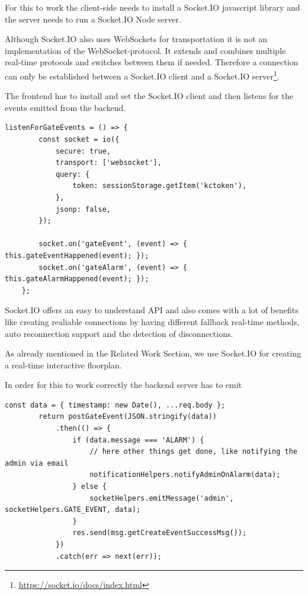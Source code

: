 For this to work the client-side needs to install a Socket.IO javascript library and the server needs to run a Socket.IO Node server. 

Although Socket.IO also uses WebSockets for transportation it is not an implementation of the WebSocket-protocol. It extends and combines multiple real-time protocols and switches between them if needed. Therefore a connection can only be established between a Socket.IO client and a Socket.IO server\footnote{\url{https://socket.io/docs/index.html}}.

The frontend has to install and set the Socket.IO client and then listens for the events emitted from the backend.

\begin{lstlisting}[label=socketIOClientSide]
listenForGateEvents = () => {
        const socket = io({
            secure: true,
            transport: ['websocket'],
            query: {
                token: sessionStorage.getItem('kctoken'),
            },
            jsonp: false,
        });

        socket.on('gateEvent', (event) => { this.gateEventHappened(event); });
        socket.on('gateAlarm', (event) => { this.gateAlarmHappened(event); });
    };
\end{lstlisting}



Socket.IO offers an easy to understand API and also comes with a lot of benefits like creating realiable connections by having different fallback real-time methods, auto reconnection support and the detection of disconnections.

As already mentioned in the Related Work Section, we use Socket.IO for creating a real-time interactive floorplan. 

In order for this to work correctly the backend server has to emit 

\begin{lstlisting}[label=socketIOServerSide]
const data = { timestamp: new Date(), ...req.body };
        return postGateEvent(JSON.stringify(data))
            .then(() => {
                if (data.message === 'ALARM') {
                    // here other things get done, like notifying the admin via email
                    notificationHelpers.notifyAdminOnAlarm(data);
                } else {
                    socketHelpers.emitMessage('admin', socketHelpers.GATE_EVENT, data);
                }
                res.send(msg.getCreateEventSuccessMsg());
            })
            .catch(err => next(err));
\end{lstlisting}

